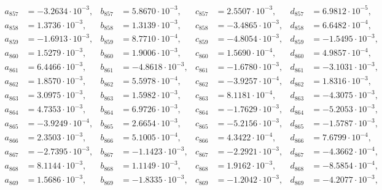 \begin{align*}
  a_{ 857 } &= -3.2634 \cdot 10^{ -3 }, & b_{ 857 } &= 5.8670 \cdot 10^{ -3 }, & c_{ 857 } &= 2.5507 \cdot 10^{ -3 }, & d_{ 857 } &= 6.9812 \cdot 10^{ -5 }, \\ 
  a_{ 858 } &= 1.3736 \cdot 10^{ -3 }, & b_{ 858 } &= 1.3139 \cdot 10^{ -3 }, & c_{ 858 } &= -3.4865 \cdot 10^{ -3 }, & d_{ 858 } &= 6.6482 \cdot 10^{ -4 }, \\ 
  a_{ 859 } &= -1.6913 \cdot 10^{ -3 }, & b_{ 859 } &= 8.7710 \cdot 10^{ -4 }, & c_{ 859 } &= -4.8054 \cdot 10^{ -3 }, & d_{ 859 } &= -1.5495 \cdot 10^{ -3 }, \\ 
  a_{ 860 } &= 1.5279 \cdot 10^{ -3 }, & b_{ 860 } &= 1.9006 \cdot 10^{ -3 }, & c_{ 860 } &= 1.5690 \cdot 10^{ -4 }, & d_{ 860 } &= 4.9857 \cdot 10^{ -4 }, \\ 
  a_{ 861 } &= 6.4466 \cdot 10^{ -3 }, & b_{ 861 } &= -4.8618 \cdot 10^{ -3 }, & c_{ 861 } &= -1.6780 \cdot 10^{ -3 }, & d_{ 861 } &= -3.1031 \cdot 10^{ -3 }, \\ 
  a_{ 862 } &= 1.8570 \cdot 10^{ -3 }, & b_{ 862 } &= 5.5978 \cdot 10^{ -4 }, & c_{ 862 } &= -3.9257 \cdot 10^{ -4 }, & d_{ 862 } &= 1.8316 \cdot 10^{ -3 }, \\ 
  a_{ 863 } &= 3.0975 \cdot 10^{ -3 }, & b_{ 863 } &= 1.5982 \cdot 10^{ -3 }, & c_{ 863 } &= 8.1181 \cdot 10^{ -4 }, & d_{ 863 } &= -4.3075 \cdot 10^{ -3 }, \\ 
  a_{ 864 } &= 4.7353 \cdot 10^{ -3 }, & b_{ 864 } &= 6.9726 \cdot 10^{ -3 }, & c_{ 864 } &= -1.7629 \cdot 10^{ -3 }, & d_{ 864 } &= -5.2053 \cdot 10^{ -3 }, \\ 
  a_{ 865 } &= -3.9249 \cdot 10^{ -4 }, & b_{ 865 } &= 2.6654 \cdot 10^{ -3 }, & c_{ 865 } &= -5.2156 \cdot 10^{ -3 }, & d_{ 865 } &= -1.5787 \cdot 10^{ -3 }, \\ 
  a_{ 866 } &= 2.3503 \cdot 10^{ -3 }, & b_{ 866 } &= 5.1005 \cdot 10^{ -4 }, & c_{ 866 } &= 4.3422 \cdot 10^{ -4 }, & d_{ 866 } &= 7.6799 \cdot 10^{ -4 }, \\ 
  a_{ 867 } &= -2.7395 \cdot 10^{ -3 }, & b_{ 867 } &= -1.1423 \cdot 10^{ -3 }, & c_{ 867 } &= -2.2921 \cdot 10^{ -3 }, & d_{ 867 } &= -4.3662 \cdot 10^{ -4 }, \\ 
  a_{ 868 } &= 8.1144 \cdot 10^{ -3 }, & b_{ 868 } &= 1.1149 \cdot 10^{ -3 }, & c_{ 868 } &= 1.9162 \cdot 10^{ -3 }, & d_{ 868 } &= -8.5854 \cdot 10^{ -4 }, \\ 
  a_{ 869 } &= 1.5686 \cdot 10^{ -3 }, & b_{ 869 } &= -1.8335 \cdot 10^{ -3 }, & c_{ 869 } &= -1.2042 \cdot 10^{ -3 }, & d_{ 869 } &= -4.2077 \cdot 10^{ -3 }, \\ 

\end{align*}
